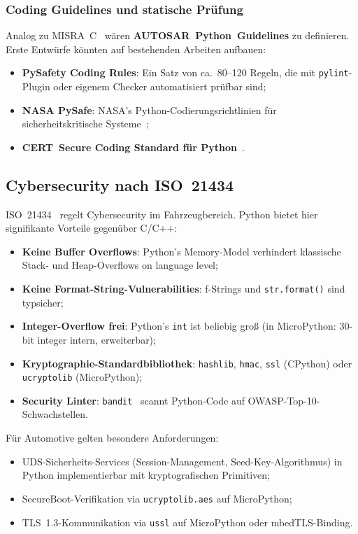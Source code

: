﻿\documentclass[12pt,a4paper,twoside]{article}
\begin{document}
\subsubsection{Coding Guidelines und statische Prüfung}
Analog zu MISRA~C~\cite{misra_c2012} wären \textbf{AUTOSAR~Python~Guidelines} zu definieren.
Erste Entwürfe könnten auf bestehenden Arbeiten aufbauen:
\begin{itemize}
  \item \textbf{PySafety Coding Rules}: Ein Satz von ca.\ 80--120 Regeln,
        die mit \texttt{pylint}-Plugin oder eigenem Checker automatisiert
        prüfbar sind;
  \item \textbf{NASA PySafe}: NASA's Python-Codierungsrichtlinien
        für sicherheitskritische Systeme~\cite{nasa_python2011};
  \item \textbf{CERT~Secure Coding Standard für Python}~\cite{cert_python2019}.
\end{itemize}

\subsection{Cybersecurity nach ISO~21434}
\label{subsec:cybersecurity}

ISO~21434~\cite{iso21434_2021} regelt Cybersecurity im Fahrzeugbereich.
Python bietet hier signifikante Vorteile gegenüber C/C++:

\begin{itemize}
  \item \textbf{Keine Buffer Overflows}: Python's Memory-Model verhindert
        klassische Stack- und Heap-Overflows on language level;
  \item \textbf{Keine Format-String-Vulnerabilities}: f-Strings und
        \texttt{str.format()} sind typsicher;
  \item \textbf{Integer-Overflow frei}: Python's \texttt{int} ist beliebig groß
        (in MicroPython: 30-bit integer intern, erweiterbar);
  \item \textbf{Kryptographie-Standardbibliothek}: \texttt{hashlib}, \texttt{hmac},
        \texttt{ssl} (CPython) oder \texttt{ucry\newline ptolib} (MicroPython);
  \item \textbf{Security Linter}: \texttt{bandit}~\cite{bandit2023} scannt
        Python-Code auf OWASP-Top-10-Schwachstellen.
\end{itemize}

Für Automotive gelten besondere Anforderungen:
\begin{itemize}
  \item UDS-Sicherheits-Services (Session-Management, Seed-Key-Algorithmus)
        in Python implementierbar mit kryptografischen Primitiven;
  \item SecureBoot-Verifikation via \texttt{ucryptolib.aes} auf MicroPython;
  \item TLS~1.3-Kommunikation via \texttt{ussl} auf MicroPython oder
        mbedTLS-Binding.
\end{itemize}
\end{document}
